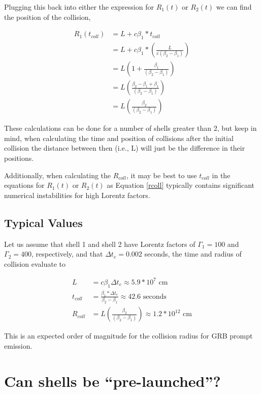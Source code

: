 \documentclass[10pt]{article}
\begin{document}
Plugging this back into either the expression for $R_1(t)$ or $R_2(t)$ we can find the position of the collision,

\begin{align}
	R_1(t_{coll}) &= L+c\beta_1*t_{coll}\\
	&= L+c\beta_1*(\frac{L}{c(\beta_2 - \beta_1)})\\
	&= L(1+ \frac{\beta_1}{(\beta_2 - \beta_1)})\\
	&= L(\frac{\beta_2 - \beta_1 + \beta_1}{(\beta_2 - \beta_1)})\\
	&= L(\frac{\beta_2}{(\beta_2 - \beta_1)}) \label{rcoll}
\end{align}

These calculations can be done for a number of shells greater than 2, but keep in mind, when calculating the time and position of collisions after the initial collision the distance between then (i.e., L) will just be the difference in their positions.

Additionally, when calculating the $R_{coll}$, it may be best to use $t_{coll}$ in the equations for $R_1(t)$ or $R_2(t)$ as Equation \ref{rcoll} typically contains significant numerical instabilities for high Lorentz factors.

\subsection*{Typical Values}

Let us assume that shell 1 and shell 2 have Lorentz factors of $\Gamma_1=100$ and $\Gamma_2=400$, respectively, and that $\Delta t_e = 0.002$ seconds, the time and radius of collision evaluate to

\begin{align}
	L &= c\beta_1\Delta t_e \approx 5.9*10^7 \text{ cm}\\
	t_{coll} &= \frac{\beta_1 * \Delta t_e}{\beta_2 - \beta_1} \approx 42.6 \text{ seconds}\\
	R_{coll} &= L(\frac{\beta_2}{(\beta_2 - \beta_1)}) \approx 1.2*10^{12} \text{ cm}
\end{align}

This is an expected order of magnitude for the collision radius for GRB prompt emission.



\section*{Can shells be ``pre-launched''?}
\end{document}
